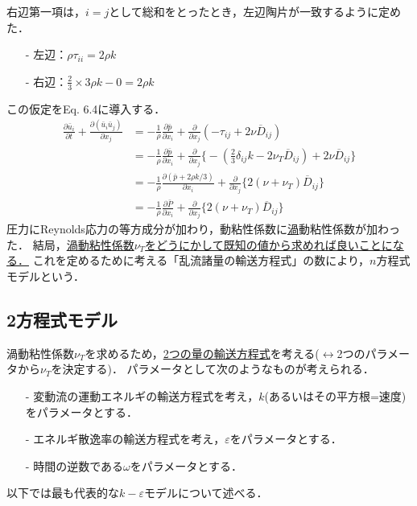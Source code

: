 \documentclass[12pt,a4paper]{jsarticle}
\begin{document}
右辺第一項は，$i=j$として総和をとったとき，左辺陶片が一致するように定めた．
\begin{itemize}
 \item[-] 左辺：$\rho \tau_{ii} =2\rho k$
 \item[-] 右辺：$\frac{2}{3}\times3\rho k -0 =2\rho k$
\end{itemize}
この仮定をEq. 6.4に導入する．
\begin{align}
  \frac{\partial \bar{u}_i}{\partial t} +\frac{\partial (\bar{u}_i \bar{u}_j)}{\partial x_j} &= -\frac{1}{\rho} \frac{\partial \bar{p}}{\partial x_i} +\frac{\partial}{\partial x_j} (-\tau_{ij} +2 \nu \overline{D}_{ij}) \nonumber \\
    &= -\frac{1}{\rho} \frac{\partial \bar{p}}{\partial x_i} +\frac{\partial}{\partial x_j} \bigl\{ -(\frac{2}{3}\delta_{ij}k -2\nu_T \overline{D}_{ij}) +2 \nu \overline{D}_{ij} \bigr\} \nonumber \\
    &= -\frac{1}{\rho} \frac{\partial (\bar{p}+2\rho k/3 )}{\partial x_i} +\frac{\partial}{\partial x_j} \{2 (\nu +\nu_T) \overline{D}_{ij}\} \nonumber \\
    &= -\frac{1}{\rho} \frac{\partial \bar{P}}{\partial x_i} +\frac{\partial}{\partial x_j} \{2 (\nu +\nu_T) \overline{D}_{ij}\} \tag{6.21}
\label{eq:EddyViscosityNSEquation}
\end{align}
圧力にReynolds応力の等方成分が加わり，動粘性係数に\underline{渦}動粘性係数が加わった．
結局，\underline{渦動粘性係数$\nu_T$をどうにかして既知の値から求めれば良いことになる．}
これを定めるために考える「乱流諸量の輸送方程式」の数により，$n$方程式モデルという．

\subsection{2方程式モデル}
\label{subsec:TwoEquationModel}

渦動粘性係数$\nu_T$を求めるため，\underline{2つの量の輸送方程式}を考える($\leftrightarrow$2つのパラメータから$\nu_T$を決定する)．
パラメータとして次のようなものが考えられる．
\begin{itemize}
 \item[-] 変動流の運動エネルギの輸送方程式を考え，$k$(あるいはその平方根=速度)をパラメータとする．
 \item[-] エネルギ散逸率の輸送方程式を考え，$\varepsilon$をパラメータとする．
 \item[-] 時間の逆数である$\omega$をパラメータとする．
\end{itemize}
以下では最も代表的な$k-\varepsilon$モデルについて述べる．
\end{document}
